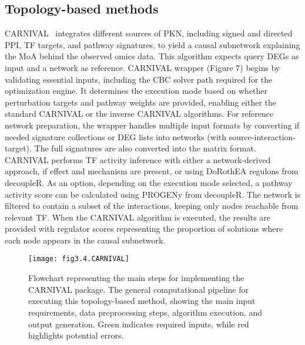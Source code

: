 \subsection{Topology-based methods} %
\label{sub:topology_based_methods}

\gls{CARNIVAL}~\cite{RN41} integrates different sources of \gls{PKN}, including signed and directed \gls{PPI}, \gls{TF} targets, and pathway signatures, to yield a causal subnetwork explaining the MoA behind the observed omics data. This algorithm expects query \gls{DEGs} as input and a network as reference. \gls{CARNIVAL} wrapper (Figure 7) begins by validating essential inputs, including the CBC solver path required for the optimization engine. 
It determines the execution mode based on whether perturbation targets and pathway weights are provided, enabling either the standard CARNIVAL or the inverse \gls{CARNIVAL} algorithms. 
For reference network preparation, the wrapper handles multiple input formats by converting if needed signature collections or DEG lists into networks (with source-interaction-target). The full signatures are also converted into the matrix format. \gls{CARNIVAL} performs \gls{TF} activity inference with either a network-derived approach, if effect and mechanism are present, or using DoRothEA regulons from decoupleR. 
As an option, depending on the execution mode selected, a pathway activity score can be calculated using PROGENy from decoupleR. 
The network is filtered to contain a subset of the interactions, keeping only nodes reachable from relevant \gls{TF}. When the \gls{CARNIVAL} algorithm is executed, the results are provided with regulator scores representing the proportion of solutions where each node appears in the causal subnetwork.


\begin{figure}[htbp]
    \centering
    \texttt{[image: fig3.4.CARNIVAL]}
    \caption[Flowchart representing the main steps for implementing the CARNIVAL package.]{Flowchart representing the main steps for implementing the CARNIVAL package. The general computational pipeline for executing this topology-based method, showing the main input requirements, data preprocessing steps, algorithm execution, and output generation. Green indicates required inputs, while red highlights potential errors.}
    \label{fig:fig3.4.CARNIVAL}
\end{figure}

